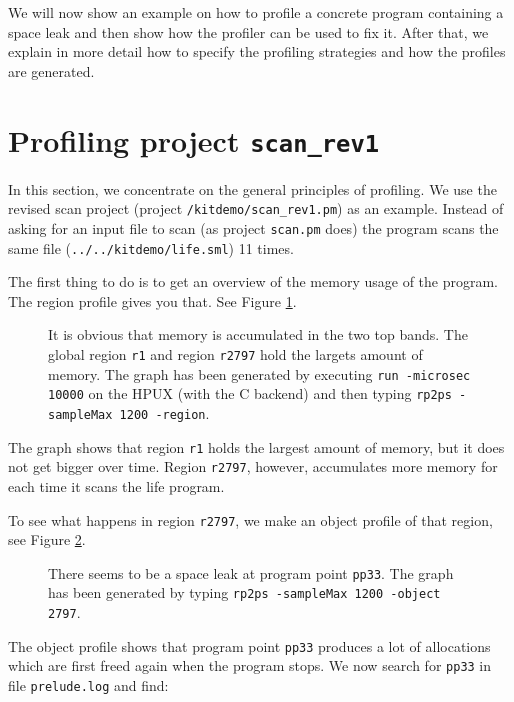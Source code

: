 \documentclass[12pt]{book}
\begin{document}
We will now show an example on how to profile a concrete program
containing a space leak and then show how the profiler can be used to
fix it. After that, we explain in more detail how to specify the profiling
strategies and how the profiles are generated.

\section{Profiling project \texttt{scan\_rev1}}

In this section, we concentrate on the general principles of profiling. We
use the revised scan project (project \texttt{/kitdemo/scan\_rev1.pm}) as
an example. Instead of asking for an input file to scan (as project
\texttt{scan.pm} does) the program scans the same file
(\texttt{../../kitdemo/life.sml}) 11 times.

The first thing to do is to get an overview of the memory usage of the
program. The region profile gives you that. See Figure
\ref{scan_rev1_1.fig}.

\begin{figure}[htb]
\begin{center}
  \caption{It is obvious that memory is accumulated in the two top
    bands. The global region \texttt{r1} and region \texttt{r2797}
    hold the largets amount of memory. The graph has been generated
    by executing \texttt{run -microsec 10000} on the HPUX (with the C
    backend) and then typing \texttt{rp2ps -sampleMax 1200
      -region}.}\label{scan_rev1_1.fig}
\end{center}
\end{figure}
The graph shows that region \texttt{r1} holds the largest amount of memory,
but it does not get bigger over time. Region \texttt{r2797}, however,
accumulates more memory for each time it scans the life
program.

To see what happens in region \texttt{r2797}, we make an object profile of
that region, see Figure \ref{scan_rev1_2.fig}.

\begin{figure}[htb]
\begin{center}
  \caption{There seems to be a space leak at program point
    \texttt{pp33}. The graph has been generated by typing \texttt{rp2ps
      -sampleMax 1200 -object 2797}.}\label{scan_rev1_2.fig}
\end{center}
\end{figure}
The object profile shows that program point \texttt{pp33} produces a lot
of allocations which are first freed again when the program stops. We now
search for \texttt{pp33} in file \texttt{prelude.log} and find:
\end{document}
